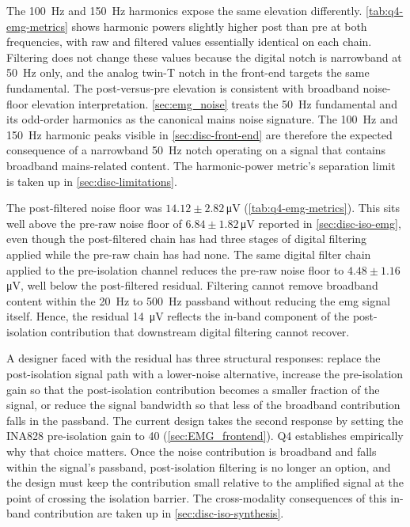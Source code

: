 The \SI{100}{\hertz} and \SI{150}{\hertz} harmonics expose the same elevation differently. \autoref{tab:q4-emg-metrics} shows harmonic powers slightly higher post than pre at both frequencies, with raw and filtered values essentially identical on each chain. Filtering does not change these values because the digital notch is narrowband at \SI{50}{\hertz} only, and the analog twin-T notch in the front-end targets the same fundamental. The post-versus-pre elevation is consistent with broadband noise-floor elevation interpretation. \autoref{sec:emg_noise} treats the \SI{50}{\hertz} fundamental and its odd-order harmonics as the canonical mains noise signature. The \SI{100}{\hertz} and \SI{150}{\hertz} harmonic peaks visible in \autoref{sec:disc-front-end} are therefore the expected consequence of a narrowband \SI{50}{\hertz} notch operating on a signal that contains broadband mains-related content. The harmonic-power metric's separation limit is taken up in \autoref{sec:disc-limitations}.

The post-filtered noise floor was $\num{14.12} \pm \num{2.82}$\,\si{\micro\volt} (\autoref{tab:q4-emg-metrics}). This sits well above the pre-raw noise floor of $\num{6.84} \pm \num{1.82}$\,\si{\micro\volt} reported in \autoref{sec:disc-iso-emg}, even though the post-filtered chain has had three stages of digital filtering applied while the pre-raw chain has had none. The same digital filter chain applied to the pre-isolation channel reduces the pre-raw noise floor to $\num{4.48} \pm \num{1.16}$\,\si{\micro\volt}, well below the post-filtered residual. Filtering cannot remove broadband content within the \SI{20}{\hertz} to \SI{500}{\hertz} passband without reducing the \gls{emg} signal itself. Hence, the residual \SI{14}{\micro\volt} reflects the in-band component of the post-isolation contribution that downstream digital filtering cannot recover.

A designer faced with the residual has three structural responses: replace the post-isolation signal path with a lower-noise alternative, increase the pre-isolation gain so that the post-isolation contribution becomes a smaller fraction of the signal, or reduce the signal bandwidth so that less of the broadband contribution falls in the passband. The current design takes the second response by setting the INA828 pre-isolation gain to 40 (\autoref{sec:EMG_frontend}). Q4 establishes empirically why that choice matters. Once the noise contribution is broadband and falls within the signal's passband, post-isolation filtering is no longer an option, and the design must keep the contribution small relative to the amplified signal at the point of crossing the isolation barrier. The cross-modality consequences of this in-band contribution are taken up in \autoref{sec:disc-iso-synthesis}. 

